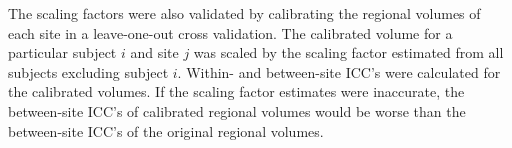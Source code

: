 The scaling factors were also validated by calibrating the regional volumes of each site in a leave-one-out cross validation. The calibrated volume for a particular subject $i$ and site $j$ was scaled by the scaling factor estimated from all subjects excluding subject $i$. Within- and between-site ICC's were calculated for the calibrated volumes. If the scaling factor estimates were inaccurate, the between-site ICC's of calibrated regional volumes would be worse than the between-site ICC's of the original regional volumes.